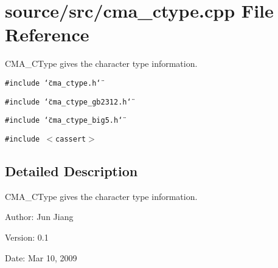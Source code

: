 \section{source/src/cma\_\-ctype.cpp File Reference}
\label{cma__ctype_8cpp}
CMA\_\-CType gives the character type information.  


{\tt \#include \char`\"{}cma\_\-ctype.h\char`\"{}}\par
{\tt \#include \char`\"{}cma\_\-ctype\_\-gb2312.h\char`\"{}}\par
{\tt \#include \char`\"{}cma\_\-ctype\_\-big5.h\char`\"{}}\par
{\tt \#include $<$cassert$>$}\par


\subsection{Detailed Description}
CMA\_\-CType gives the character type information. 

\begin{Desc}
\item[Author:]Jun Jiang \end{Desc}
\begin{Desc}
\item[Version:]0.1 \end{Desc}
\begin{Desc}
\item[Date:]Mar 10, 2009 \end{Desc}
